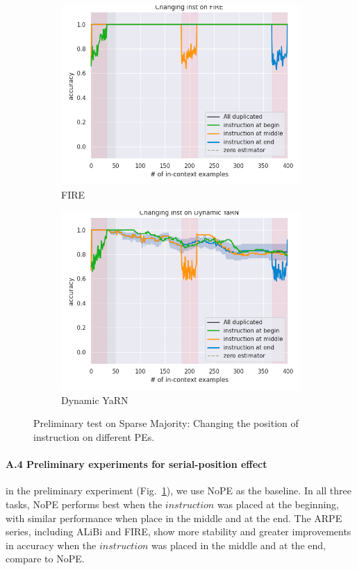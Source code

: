 \documentclass[letterpaper]{article} %
\begin{document}
\begin{figure}[htbp]
\begin{subfigure}[b]{0.23\textwidth}
        \includegraphics[width=\textwidth]{AnonymousSubmission/LaTeX/imgs/appendix/fire_inst.png}
        \caption{FIRE}
    \end{subfigure}
    \begin{subfigure}[b]{0.23\textwidth}
        \includegraphics[width=\textwidth]{AnonymousSubmission/LaTeX/imgs/appendix/dyarn_inst.png}
        \caption{Dynamic YaRN}
    \end{subfigure}
    \caption{
       Preliminary test on Sparse Majority: Changing the position of instruction on different PEs.
    }
    \label{fig:pre-serial}
\end{figure}

\paragraph{A.4 Preliminary experiments for serial-position effect}
in the preliminary experiment (Fig.~\ref{fig:pre-serial}), we use NoPE as the baseline. In all three tasks, NoPE performs best when the $instruction$ was placed at the beginning, with similar performance when place in the middle and at the end. The ARPE series, including ALiBi and FIRE, show more stability and greater improvements in accuracy when the $instruction$ was placed in the middle and at the end, compare to NoPE.
\end{document}
